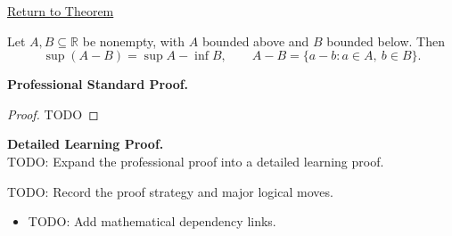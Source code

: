 \newpage
{}
\label{prf:supremum-difference-set}

\begin{remark*}[Return]
\hyperref[thm:supremum-difference-set]{Return to Theorem}
\end{remark*}

\begin{theorem*}
Let $A,B\subseteq\mathbb{R}$ be nonempty, with $A$ bounded above and $B$ bounded below. Then
\[
  \sup(A-B)=\sup A-\inf B,
  \qquad
  A-B=\{a-b:a\in A,\ b\in B\}.
\]
\end{theorem*}

\textbf{Professional Standard Proof.}~\\
\begin{proof}
TODO
\end{proof}

\textbf{Detailed Learning Proof.}~\\
TODO: Expand the professional proof into a detailed learning proof.

\begin{remark*}
TODO: Record the proof strategy and major logical moves.
\end{remark*}

\begin{dependencies}
\begin{itemize}
  \item TODO: Add mathematical dependency links.
\end{itemize}
\end{dependencies}
